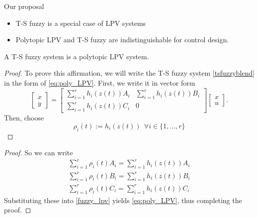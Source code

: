 \begin{frame}{Our proposal}
\begin{itemize}
        \item T-S fuzzy is a special case of LPV systems
        \item Polytopic LPV and T-S fuzzy are indistinguishable for control design. 
    \end{itemize}
\end{frame}
\begin{frame}{}
    \begin{theorem}
A T-S fuzzy system is a polytopic LPV system.
\end{theorem}
\begin{proof} \renewcommand{\qedsymbol}{}
To prove this affirmation, we will write the T-S fuzzy system \eqref{tsfuzzyblend} in the form of \eqref{eq:poly_LPV}. First, we write it in vector form
\begin{equation} \label{fuzzy_lpv}
 \begin{bmatrix}
    \dot{x}\\
    y
 \end{bmatrix} = \begin{bmatrix} 
\displaystyle    \sum_{i=1}^{r}h_i(z(t))A_i & \displaystyle \sum_{i=1}^{r}h_i(z(t))B_i\\
\displaystyle    \sum_{i=1}^{r}h_i(z(t))C_i & 0
 \end{bmatrix}\begin{bmatrix}
 x\\
 u
 \end{bmatrix}.
\end{equation}
Then, choose
\begin{equation}
    \rho_i(t) :=  h_i(z(t)) ~~\forall i \in \{1,...,r\}
\end{equation}
\end{proof}
\end{frame}

\begin{frame}{}
    \begin{proof}
So we can write
\begin{eqnarray} \label{matrices}
\sum_{i=1}^{r}\rho_i(t)A_i =  \sum_{i=1}^{r}h_i(z(t))A_i\\
\sum_{i=1}^{r}\rho_i(t)B_i =  \sum_{i=1}^{r}h_i(z(t))B_i\\
\sum_{i=1}^{r}\rho_i(t)C_i =  \sum_{i=1}^{r}h_i(z(t))C_i
\end{eqnarray}
Substituting these into \eqref{fuzzy_lpv} yields \eqref{eq:poly_LPV}, thus completing the proof. 
\end{proof}
\end{frame}

